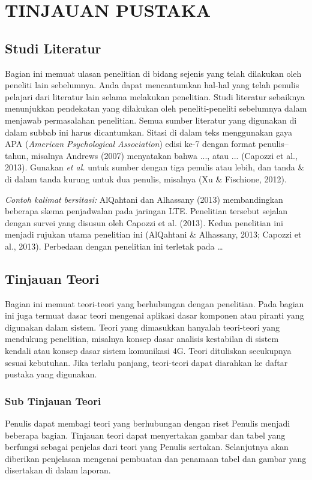 \chapter{TINJAUAN PUSTAKA}

\section{Studi Literatur}
Bagian ini memuat ulasan penelitian di bidang sejenis yang telah dilakukan oleh peneliti lain sebelumnya. Anda dapat mencantumkan hal-hal yang telah penulis pelajari dari literatur lain selama melakukan penelitian. Studi literatur sebaiknya menunjukkan pendekatan yang dilakukan oleh peneliti-peneliti sebelumnya dalam menjawab permasalahan penelitian. Semua sumber literatur yang digunakan di dalam subbab ini harus dicantumkan. Sitasi di dalam teks menggunakan gaya APA (\textit{American Psychological Association}) edisi ke-7 dengan format penulis--tahun, misalnya Andrews (2007) menyatakan bahwa ..., atau ... (Capozzi et al., 2013). Gunakan \textit{et al.} untuk sumber dengan tiga penulis atau lebih, dan tanda \& di dalam tanda kurung untuk dua penulis, misalnya (Xu \& Fischione, 2012).

\textit{Contoh kalimat bersitasi:} AlQahtani dan Alhassany (2013) membandingkan beberapa skema penjadwalan pada jaringan LTE. Penelitian tersebut sejalan dengan survei yang disusun oleh Capozzi et al. (2013). Kedua penelitian ini menjadi rujukan utama penelitian ini (AlQahtani \& Alhassany, 2013; Capozzi et al., 2013). Perbedaan dengan penelitian ini terletak pada …

\section{Tinjauan Teori}
Bagian ini memuat teori-teori yang berhubungan dengan penelitian. Pada bagian ini juga termuat dasar teori mengenai aplikasi dasar komponen atau piranti yang digunakan dalam sistem. Teori yang dimasukkan hanyalah teori-teori yang mendukung penelitian, misalnya konsep dasar analisis kestabilan di sistem kendali atau konsep dasar sistem komunikasi 4G. Teori dituliskan secukupnya sesuai kebutuhan. Jika terlalu panjang, teori-teori dapat diarahkan ke daftar pustaka yang digunakan.

\subsection{Sub Tinjauan Teori}
Penulis dapat membagi teori yang berhubungan dengan riset Penulis menjadi beberapa bagian. Tinjauan teori dapat menyertakan gambar dan tabel yang berfungsi sebagai penjelas dari teori yang Penulis sertakan. Selanjutnya akan diberikan penjelasan mengenai pembuatan dan penamaan tabel dan gambar yang disertakan di dalam laporan.

